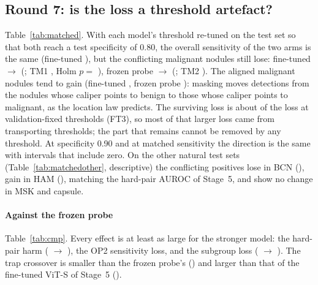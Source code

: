 \subsection{Round 7: is the loss a threshold artefact?}
Table~\ref{tab:matched}. With each model's threshold re-tuned on the test set so that both reach a test specificity of
0.80, the overall sensitivity of the two arms is the same (fine-tuned \sEightMfinetunedroundSixMspecEightZerosens), but the
conflicting malignant nodules still lose: fine-tuned \sEightTMOneErm{} $\to$ \sEightTMOneMask{} (\sEightTMOne; TM1
\sEightTMOneVerdict, Holm $p=$ \sEightTMOneHolm), frozen probe \sEightTMTwoErm{} $\to$ \sEightTMTwoMask{} (\sEightTMTwo;
TM2 \sEightTMTwoVerdict). The aligned malignant nodules tend to gain (fine-tuned
\sEightMfinetunedroundSixMspecEightZerosensaligned, frozen probe \sEightMfrozenstageFiveMspecEightZerosensaligned): masking
moves detections from the nodules whose caliper points to benign to
those whose caliper points to malignant, as the location law predicts. The surviving loss is about \sEightTMShare{} of the
loss at validation-fixed thresholds (FT3), so most of that larger loss came from transporting thresholds; the part that
remains cannot be removed by any threshold. At specificity 0.90 and at matched sensitivity the direction is the same with
intervals that include zero. On the other natural test sets (Table~\ref{tab:matchedother}, descriptive) the conflicting
positives lose in BCN (\sEightMOtherisicBCN), gain in HAM (\sEightMOtherisicHAM), matching the hard-pair AUROC of Stage~5,
and show no change in MSK and capsule.


\paragraph{Against the frozen probe} Table~\ref{tab:cmp}. Every effect is at least as large for the stronger model: the
hard-pair harm (\sEightFrozenHard{} $\to$ \sEightFTOne), the OP2 sensitivity loss, and the subgroup loss
(\sEightFrozenConf{} $\to$ \sEightFTThree). The trap crossover is smaller than the frozen probe's (\sEightFrozenCross) and
larger than that of the fine-tuned ViT-S of Stage~5 (\sEightViTSCross).


